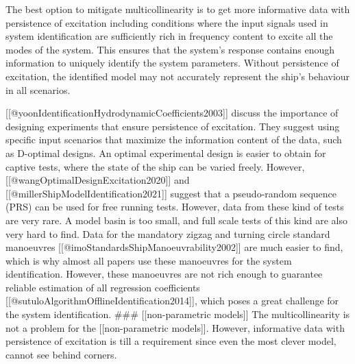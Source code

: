The best option to mitigate multicollinearity is to get more informative data with persistence of excitation including conditions where the input signals used in system identification are sufficiently rich in frequency content to excite all the modes of the system. This ensures that the system's response contains enough information to uniquely identify the system parameters. Without persistence of excitation, the identified model may not accurately represent the ship's behaviour in all scenarios.

[[@yoonIdentificationHydrodynamicCoefficients2003]] discuss the importance of designing experiments that ensure persistence of excitation. They suggest using specific input scenarios that maximize the information content of the data, such as D-optimal designs. An optimal experimental design is easier to obtain for captive tests, where the state of the ship can be varied freely. However, [[@wangOptimalDesignExcitation2020]] and  [[@millerShipModelIdentification2021]] suggest that a pseudo-random sequence (PRS) can be used for free running tests.  However, data from these kind of tests are very rare. A model basin is too small, and full scale tests of this kind are also very hard to find. 
Data for the mandatory zigzag and turning circle standard manoeuvres [[@imoStandardsShipManoeuvrability2002]] are much easier to find, which is why almost all papers use these manoeuvres for the system identification. However, these manoeuvres are not rich enough to guarantee reliable estimation of all regression coefficients [[@sutuloAlgorithmOfflineIdentification2014]], which poses a great challenge for the system identification.
### [[non-parametric models]]
The multicollinearity is not a problem for the [[non-parametric models]]. However, informative data with persistence of excitation is till a requirement since even the most clever model, cannot see behind corners. 

